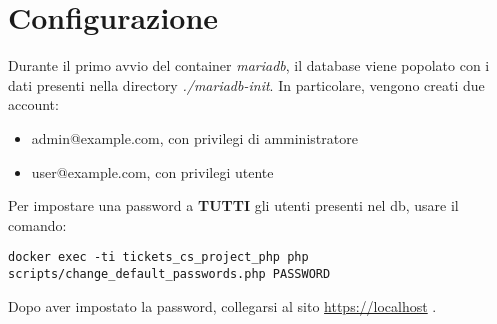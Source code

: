 \documentclass[italian,12pt,a4paper,oneside,final]{report}
\begin{document}
\section{Configurazione}
Durante il primo avvio del container \emph{mariadb}, il database viene popolato con i dati presenti nella directory \textit{./mariadb-init}. \newline
In particolare, vengono creati due account:

\begin{itemize}
	\item admin@example.com, con privilegi di amministratore
	\item user@example.com, con privilegi utente
\end{itemize}

\noindent Per impostare una password a  \textbf{TUTTI} gli utenti presenti nel db, usare il comando:

\begin{lstlisting}
docker exec -ti tickets_cs_project_php php scripts/change_default_passwords.php PASSWORD
\end{lstlisting}

\noindent Dopo aver impostato la password, collegarsi al sito \url{https://localhost} .
\end{document}
